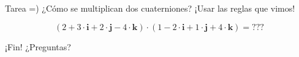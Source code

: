\documentclass[10pt]{beamer}
\def\R{\mathbb{R}}
\def\ii{\textbf{i}}
\def\jj{\textbf{j}}
\def\kk{\textbf{k}}
\begin{document}
\begin{frame}{Tarea =)}
	¿Cómo se multiplican dos cuaterniones? ¡Usar las reglas que vimos! \bigskip
	
	$$(2+3\cdot \ii + 2 \cdot \jj - 4 \cdot \kk) \cdot (1-2\cdot \ii + 1 \cdot \jj + 4 \cdot \kk) = \text{???}$$
	
	
\end{frame}

\begin{frame}{¡Fin!}
\Huge ¿Preguntas?
\end{frame}

\end{document}
